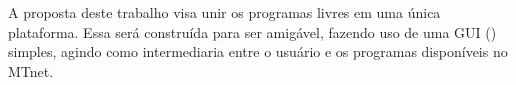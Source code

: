     A proposta deste trabalho visa unir os programas livres em uma única plataforma. Essa será construída para ser amigável, fazendo uso de uma GUI () simples, agindo como intermediaria entre o usuário e os programas disponíveis no MTnet.
    

    
    
     
    
